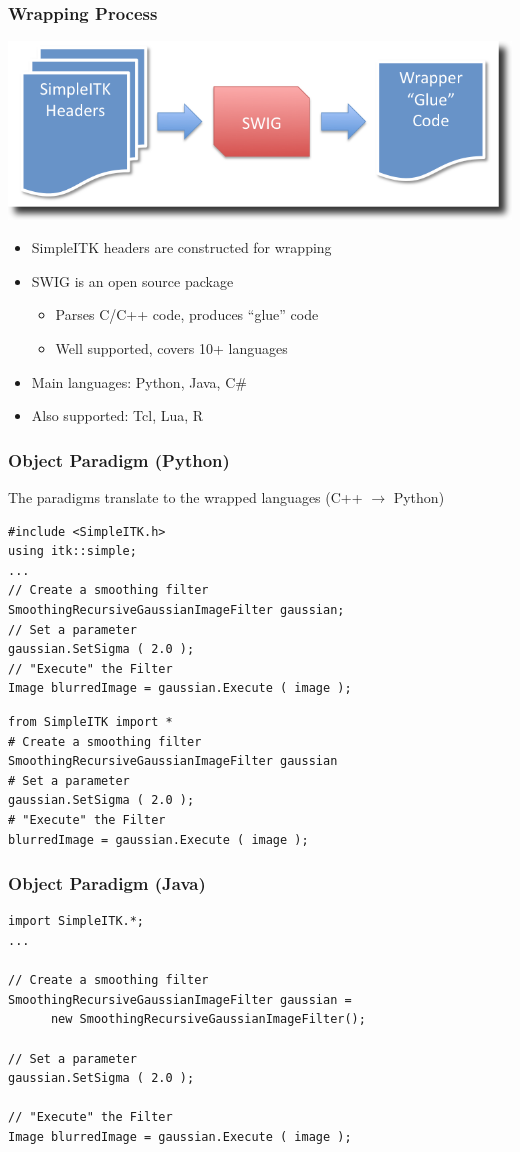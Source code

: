 \begin{frame}[fragile]
\frametitle{Wrapping Process}
\begin{center}
  \includegraphics[width=.8\textwidth]{Images/WrappingProcess_shadow}
\end{center}
\begin{itemize}
  \item SimpleITK headers are constructed for wrapping
  \item SWIG is an open source package
  \begin{itemize}
    \item Parses C/C++ code, produces ``glue'' code
    \item Well supported, covers 10+ languages
  \end{itemize}
  \item Main languages: Python, Java, C\#
  \item Also supported: Tcl, Lua, R
\end{itemize}
\end{frame}

\begin{frame}[fragile]
\frametitle{Object Paradigm (Python)}
The paradigms translate to the wrapped languages (C++ $\rightarrow$ Python)
\lstcpp
\begin{lstlisting}
#include <SimpleITK.h>
using itk::simple;
...
// Create a smoothing filter
SmoothingRecursiveGaussianImageFilter gaussian;
// Set a parameter
gaussian.SetSigma ( 2.0 );
// "Execute" the Filter
Image blurredImage = gaussian.Execute ( image );
\end{lstlisting}
\lstpython
\begin{lstlisting}
from SimpleITK import *
# Create a smoothing filter
SmoothingRecursiveGaussianImageFilter gaussian
# Set a parameter
gaussian.SetSigma ( 2.0 );
# "Execute" the Filter
blurredImage = gaussian.Execute ( image );
\end{lstlisting}
\end{frame}

\begin{frame}[fragile]
\frametitle{Object Paradigm (Java)}
\lstjava
\begin{lstlisting}
import SimpleITK.*;
...

// Create a smoothing filter
SmoothingRecursiveGaussianImageFilter gaussian =
      new SmoothingRecursiveGaussianImageFilter();

// Set a parameter
gaussian.SetSigma ( 2.0 );

// "Execute" the Filter
Image blurredImage = gaussian.Execute ( image );
\end{lstlisting}
\end{frame}


